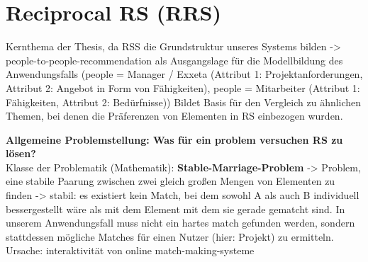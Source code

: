 
\section{Reciprocal RS (RRS)}
Kernthema der Thesis, da RSS die Grundstruktur unseres Systems bilden
-> people-to-people-recommendation als Ausgangslage für die Modellbildung des Anwendungsfalls (people = Manager / Exxeta (Attribut 1: Projektanforderungen, Attribut 2: Angebot in Form von Fähigkeiten), people = Mitarbeiter (Attribut 1: Fähigkeiten, Attribut 2: Bedürfnisse))
Bildet Basis für den Vergleich zu ähnlichen Themen, bei denen die Präferenzen von Elementen in RS einbezogen wurden.

\textbf{Allgemeine Problemstellung: Was für ein problem versuchen RS zu lösen?}\\
Klasse der Problematik (Mathematik): \textbf{Stable-Marriage-Problem} -> Problem, eine stabile Paarung zwischen zwei gleich großen Mengen von Elementen zu finden -> stabil: es existiert kein Match, bei dem sowohl A als auch B individuell bessergestellt wäre als mit dem Element mit dem sie gerade gematcht sind.%
In unserem Anwendungsfall muss nicht ein hartes match gefunden werden, sondern stattdessen mögliche Matches für einen Nutzer (hier: Projekt) zu ermitteln. Ursache: interaktivität von online match-making-systeme %


